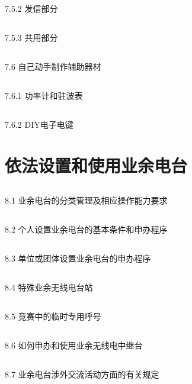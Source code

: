 \documentclass[12pt,UTF8]{ctexbook}
\begin{document}
\section{}7.5.2 发信部分
\section{}7.5.3 共用部分
\section{}7.6 自己动手制作辅助器材
\section{}7.6.1 功率计和驻波表
\section{}7.6.2 DIY电子电键

\chapter{依法设置和使用业余电台}

\section{}8.1 业余电台的分类管理及相应操作能力要求
\section{}8.2 个人设置业余电台的基本条件和申办程序
\section{}8.3 单位或团体设置业余电台的申办程序
\section{}8.4 特殊业余无线电台站
\section{}8.5 竞赛中的临时专用呼号
\section{}8.6 如何申办和使用业余无线电中继台
\section{}8.7 业余电台涉外交流活动方面的有关规定
\end{document}
